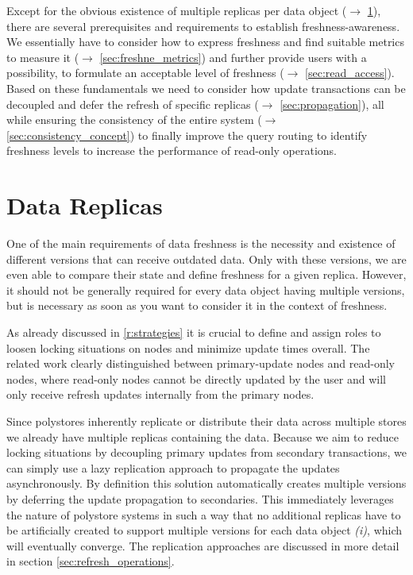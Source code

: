 Except for the obvious existence of multiple replicas per data object ($\rightarrow$ \ref{sec:data_replicas}), 
there are several prerequisites and requirements to establish freshness-awareness. 
We essentially have to consider how to express freshness and find suitable metrics to measure it ($\rightarrow$ \ref{sec:freshne_metrics})
and further provide users with a possibility, to formulate an acceptable level of freshness ($\rightarrow$ \ref{sec:read_access}). 
Based on these fundamentals we need to consider how update transactions can be decoupled and defer the refresh of specific replicas 
($\rightarrow$ \ref{sec:propagation}), all while ensuring the consistency of the entire system ($\rightarrow$ \ref{sec:consistency_concept}) to finally 
improve the query routing to identify freshness levels to increase the performance of read-only operations. 



\section{Data Replicas}
\label{sec:data_replicas}

One of the main requirements of data freshness is the necessity and existence of different versions that can receive outdated data. 
Only with these versions, we are even able to compare their state and define freshness for a given replica.
However, it should not be generally required for every data object having multiple versions, but is necessary as soon 
as you want to consider it in the context of freshness.

As already discussed in \ref{r:strategies} it is crucial to define and assign roles to loosen locking situations on nodes
and minimize update times overall.
The related work clearly distinguished between primary-update nodes and read-only nodes, where 
read-only nodes cannot be directly updated by the user and will only receive refresh updates internally from the primary nodes.

Since polystores inherently replicate or distribute their data across multiple stores we already have multiple replicas containing the data. 
Because we aim to reduce locking situations by decoupling primary updates from secondary transactions,
we can simply use a lazy replication approach to propagate the updates asynchronously. 
By definition this solution automatically creates multiple versions by deferring the update propagation to secondaries.
This immediately leverages the nature of polystore systems in such a way that no additional replicas have to be artificially created
to support multiple versions for each data object \textit{(i)}, which will eventually converge. 
The replication approaches are discussed in more detail in section \ref{sec:refresh_operations}.\\


